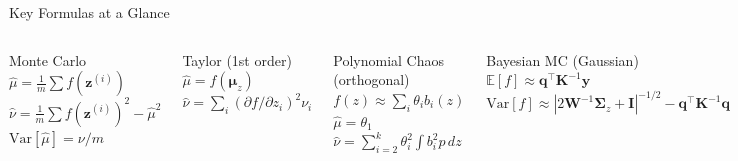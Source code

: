 \documentclass[aspectratio=169,10pt]{beamer}
\newcommand{\bz}{\mathbf{z}}
\newcommand{\bmu}{\boldsymbol{\mu}}
\newcommand{\bSigma}{\boldsymbol{\Sigma}}
\newcommand{\E}{\mathbb{E}}
\newcommand{\Var}{\mathrm{Var}}
\newcommand{\hmu}{\hat{\mu}}
\newcommand{\hnu}{\hat{\nu}}
\begin{document}
\begin{frame}{Key Formulas at a Glance}
  \begin{columns}[T]
      \begin{block}{Monte Carlo}
        $\hmu = \tfrac{1}{m}\sum f(\bz^{(i)})$\\
        $\hnu = \tfrac{1}{m}\sum f(\bz^{(i)})^2 - \hmu^2$\\
        $\Var[\hmu] = \nu/m$
      \end{block}
      \medskip
      \begin{block}{Taylor (1st order)}
        $\hmu = f(\bmu_z)$\\
        $\hnu = \sum_i (\partial f/\partial z_i)^2 \nu_i$
      \end{block}
      \begin{block}{Polynomial Chaos (orthogonal)}
        $f(z)\approx\sum_i\theta_i b_i(z)$\\
        $\hmu = \theta_1$\\
        $\hnu = \sum_{i=2}^k\theta_i^2\int b_i^2 p\,dz$
      \end{block}
      \medskip
      \begin{block}{Bayesian MC (Gaussian)}
        $\E[f]\approx\mathbf{q}^\top\mathbf{K}^{-1}\mathbf{y}$\\
        $\Var[f]\approx|2\mathbf{W}^{-1}\bSigma_z{+}\mathbf{I}|^{-1/2}
         -\mathbf{q}^\top\mathbf{K}^{-1}\mathbf{q}$
      \end{block}
  \end{columns}
\end{frame}
\end{document}
